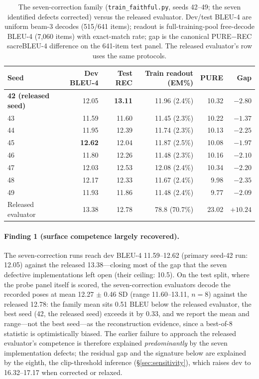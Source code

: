 \documentclass[pdflatex,sn-chicago]{sn-jnl}
\begin{document}
\begin{table}[h]
\centering
\scriptsize\setlength{\tabcolsep}{4pt}
\caption{The seven-correction family (\texttt{train\_faithful.py}, seeds 42--49; the seven identified defects corrected) versus the released evaluator. Dev/test BLEU-4 are uniform beam-3 decodes (515/641 items); readout is full-training-pool free-decode BLEU-4 (7{,}060 items) with exact-match rate; gap is the canonical PURE$-$REC sacreBLEU-4 difference on the 641-item test panel. The released evaluator's row uses the same protocols.}
\label{tab:faithful_results}
\begin{tabular}{lrrrrr}
\toprule
Seed & Dev BLEU-4 & Test REC & Train readout (EM\%) & PURE & Gap \\
\midrule
\textbf{42 (released seed)} & 12.05 & \textbf{13.11} & 11.96 (2.4\%) & 10.32 & $-2.80$ \\
43 & 11.59 & 11.60 & 11.45 (2.3\%) & 10.22 & $-1.37$ \\
44 & 11.95 & 12.39 & 11.74 (2.3\%) & 10.13 & $-2.25$ \\
45 & \textbf{12.62} & 12.04 & 11.87 (2.5\%) & 10.08 & $-1.97$ \\
46 & 11.80 & 12.26 & 11.48 (2.3\%) & 10.16 & $-2.10$ \\
47 & 12.03 & 12.53 & 12.08 (2.4\%) & 10.34 & $-2.20$ \\
48 & 12.17 & 12.33 & 11.67 (2.4\%) & 9.98 & $-2.35$ \\
49 & 11.93 & 11.86 & 11.48 (2.4\%) & 9.77 & $-2.09$ \\
\midrule
Released evaluator & 13.38 & 12.78 & 78.8 (70.7\%) & 23.02 & $+10.24$ \\
\bottomrule
\end{tabular}
\end{table}

\paragraph{Finding 1 (surface competence largely recovered).}
\label{sec:faithful_results}
The seven-correction runs reach dev BLEU-4 11.59--12.62 (primary seed-42 run: 12.05) against the released 13.38---closing most of the gap that the seven defective implementations left open (their ceiling: 10.5). On the test split, where the probe panel itself is scored, the seven-correction evaluators decode the recorded poses at mean 12.27 $\pm$ 0.46 SD (range 11.60--13.11, $n{=}8$) against the released 12.78: the family mean sits 0.51 BLEU below the released evaluator, the best seed (42, the released seed) exceeds it by 0.33, and we report the mean and range---not the best seed---as the reconstruction evidence, since a best-of-8 statistic is optimistically biased. The earlier failure to approach the released evaluator's competence is therefore explained \emph{predominantly} by the seven implementation defects; the residual gap and the signature below are explained by the eighth, the clip-threshold inference (\S\ref{sec:sensitivity}), which raises dev to 16.32--17.17 when corrected or relaxed.
\end{document}
